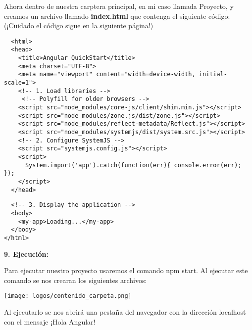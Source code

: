 \documentclass[openany]{book}
\begin{document}
Ahora dentro de nuestra carptera principal, en mi caso llamada Proyecto, y creamos un archivo llamado \textbf{index.html} que contenga el siguiente código: (¡Cuidado el código sigue en la siguiente página!)
\begin{lstlisting}
  <html>
  <head>
    <title>Angular QuickStart</title>
    <meta charset="UTF-8">
    <meta name="viewport" content="width=device-width, initial-scale=1">
    <!-- 1. Load libraries -->
     <!-- Polyfill for older browsers -->
    <script src="node_modules/core-js/client/shim.min.js"></script>
    <script src="node_modules/zone.js/dist/zone.js"></script>
    <script src="node_modules/reflect-metadata/Reflect.js"></script>
    <script src="node_modules/systemjs/dist/system.src.js"></script>
    <!-- 2. Configure SystemJS -->
    <script src="systemjs.config.js"></script>
    <script>
      System.import('app').catch(function(err){ console.error(err); });
    </script>
  </head>
\end{lstlisting}
  \pagebreak 
  \vspace*{5\baselineskip}
  \begin{lstlisting}
  <!-- 3. Display the application -->
  <body>
    <my-app>Loading...</my-app>
  </body>
</html>
\end{lstlisting}

\textbf{9. Ejecución: }

Para ejecutar nuestro proyecto usaremos el comando npm start. Al ejecutar este comando se nos crearan los siguientes archivos:
\begin{center}
  \texttt{[image: logos/contenido\_carpeta.png]}
\end{center}
Al ejecutarlo se nos abrirá una pestaña del navegador con la dirección localhost con el mensaje ¡Hola Angular!
\end{document}

